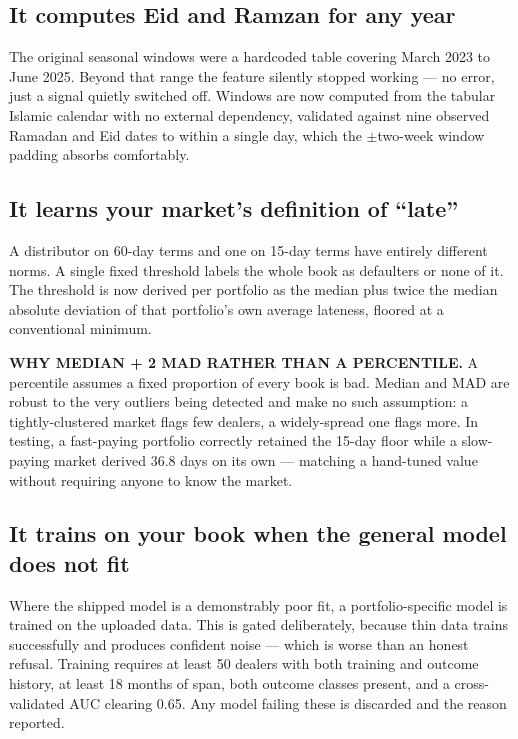 \documentclass[11pt,a4paper]{article}
\newcommand{\lab}[1]{{\color{navy}\bfseries\footnotesize #1}}
\begin{document}
\subsection{It computes Eid and Ramzan for any year}

The original seasonal windows were a hardcoded table covering March 2023 to June
2025. Beyond that range the feature silently stopped working --- no error, just
a signal quietly switched off. Windows are now computed from the tabular Islamic
calendar with no external dependency, validated against nine observed
Ramadan and Eid dates to within a single day, which the $\pm$two-week window
padding absorbs comfortably.

\subsection{It learns your market's definition of ``late''}

A distributor on 60-day terms and one on 15-day terms have entirely different
norms. A single fixed threshold labels the whole book as defaulters or none of
it. The threshold is now derived per portfolio as the median plus twice the
median absolute deviation of that portfolio's own average lateness, floored at a
conventional minimum.

\begin{callout}
\lab{WHY MEDIAN + 2 MAD RATHER THAN A PERCENTILE.} A percentile assumes a fixed
proportion of every book is bad. Median and MAD are robust to the very outliers
being detected and make no such assumption: a tightly-clustered market flags
few dealers, a widely-spread one flags more. In testing, a fast-paying portfolio
correctly retained the 15-day floor while a slow-paying market derived 36.8
days on its own --- matching a hand-tuned value without requiring anyone to
know the market.
\end{callout}

\subsection{It trains on your book when the general model does not fit}

Where the shipped model is a demonstrably poor fit, a portfolio-specific model
is trained on the uploaded data. This is gated deliberately, because thin data
trains successfully and produces confident noise --- which is worse than an
honest refusal. Training requires at least 50 dealers with both training and
outcome history, at least 18 months of span, both outcome classes present, and a
cross-validated AUC clearing 0.65. Any model failing these is discarded and the
reason reported.
\end{document}
